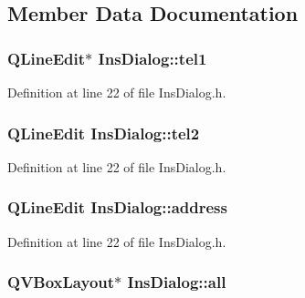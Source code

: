 \subsection{Member Data Documentation}
\hypertarget{class_ins_dialog_a2edd5f0fce0dcc6f12c4f8cd391b5fc0}{
\subsubsection[{tel1}]{\setlength{\rightskip}{0pt plus 5cm}Q\+Line\+Edit$\ast$ Ins\+Dialog\+::tel1\hspace{0.3cm}{\ttfamily [private]}}}\label{class_ins_dialog_a2edd5f0fce0dcc6f12c4f8cd391b5fc0}


Definition at line 22 of file Ins\+Dialog.\+h.

\hypertarget{class_ins_dialog_a80b1bd54ec9e97020280559e6b5532db}{
\subsubsection[{tel2}]{\setlength{\rightskip}{0pt plus 5cm}Q\+Line\+Edit Ins\+Dialog\+::tel2\hspace{0.3cm}{\ttfamily [private]}}}\label{class_ins_dialog_a80b1bd54ec9e97020280559e6b5532db}


Definition at line 22 of file Ins\+Dialog.\+h.

\hypertarget{class_ins_dialog_acd23e80138ee75cc27dd87dff5457ba9}{
\subsubsection[{address}]{\setlength{\rightskip}{0pt plus 5cm}Q\+Line\+Edit Ins\+Dialog\+::address\hspace{0.3cm}{\ttfamily [private]}}}\label{class_ins_dialog_acd23e80138ee75cc27dd87dff5457ba9}


Definition at line 22 of file Ins\+Dialog.\+h.

\hypertarget{class_ins_dialog_ab8de5f3cd72b44a3b3524fc52bac148c}{
\subsubsection[{all}]{\setlength{\rightskip}{0pt plus 5cm}Q\+V\+Box\+Layout$\ast$ Ins\+Dialog\+::all\hspace{0.3cm}{\ttfamily [private]}}}\label{class_ins_dialog_ab8de5f3cd72b44a3b3524fc52bac148c}


